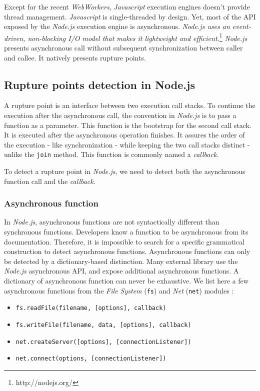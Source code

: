 Except for the recent \textit{WebWorkers}, \textit{Javascript} execution engines doesn't provide thread management.
\textit{Javascript} is single-threaded by design.
Yet, most of the API exposed by the \textit{Node.js} execution engine is asynchronous.
\textit{Node.js uses an event-driven, non-blocking I/O model that makes it lightweight and efficient.}\footnote{\raggedright http://nodejs.org/}
\textit{Node.js} presents asynchronous call without subsequent synchronization between caller and callee.
It natively presents rupture points.

\subsection{Rupture points detection in Node.js}

A rupture point is an interface between two execution call stacks.
To continue the execution after the asynchronous call, the convention in \textit{Node.js} is to pass a function as a parameter.
This function is the bootstrap for the second call stack.
It is executed after the asynchronous operation finishes.
It assures the order of the execution - like synchronization - while keeping the two call stacks distinct - unlike the \texttt{join} method.
This function is commonly named a \textit{callback}.

To detect a rupture point in \textit{Node.js}, we need to detect both the asynchronous function call and the \textit{callback}.

\subsubsection{Asynchronous function}

In \textit{Node.js}, asynchronous functions are not syntactically different than synchronous functions.
Developers know a function to be asynchronous from its documentation.
Therefore, it is impossible to search for a specific grammatical construction to detect asynchronous functions.
Asynchronous functions can only be detected by a dictionary-based distinction.
Many external library use the \textit{Node.js} asynchronous API, and expose additional asynchronous functions.
A dictionary of asynchronous function can never be exhaustive.
We list here a few asynchronous functions from the \textit{File System} (\texttt{fs}) and \textit{Net} (\texttt{net}) modules :
\begin{itemize}
  \item \texttt{fs.readFile(filename, [options], callback)}
  \item \texttt{fs.writeFile(filename, data, [options], callback)}
  \item \texttt{net.createServer([options], [connectionListener])}
  \item \texttt{net.connect(options, [connectionListener])}
\end{itemize}

